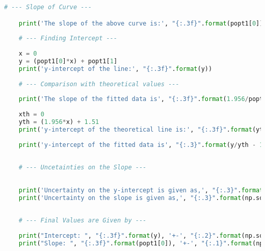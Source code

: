     
    
    
    

\begin{lstlisting}[language = Python, frame = single]
    # --- Slope of Curve --- 

    print('The slope of the above curve is:', "{:.3f}".format(popt1[0]))
    
    # --- Finding Intercept --- 
    
    x = 0
    y = (popt1[0]*x) + popt1[1]
    print('y-intercept of the line:', "{:.3f}".format(y))
    
    # --- Comparison with theoretical values --- 
    
    print('The slope of the fitted data is', "{:.3f}".format(1.956/popt1[0] - 1),'% greater than predicted value for slope.')
    
    xth = 0
    yth = (1.956*x) + 1.51
    print('y-intercept of the theoretical line is:', "{:.3f}".format(yth))
    
    print('y-intercept of the fitted data is', "{:.3}".format(y/yth - 1),'% greater than predicted value for slope.')
    
    
    # --- Uncetainties on the Slope --- 
    
    
    print('Uncertainty on the y-intercept is given as,', "{:.3}".format(np.sqrt(pcov1[0][0])))
    print('Uncertainty on the slope is given as,', "{:.3}".format(np.sqrt(pcov1[1][1])))
    
    
    # --- Final Values are Given by --- 
    
    print("Intercept: ", "{:.3f}".format(y), '+-', "{:.2}".format(np.sqrt(pcov1[0][0])))
    print("Slope: ", "{:.3f}".format(popt1[0]), '+-', "{:.1}".format(np.sqrt(pcov1[1][1])))
    
\end{lstlisting}

